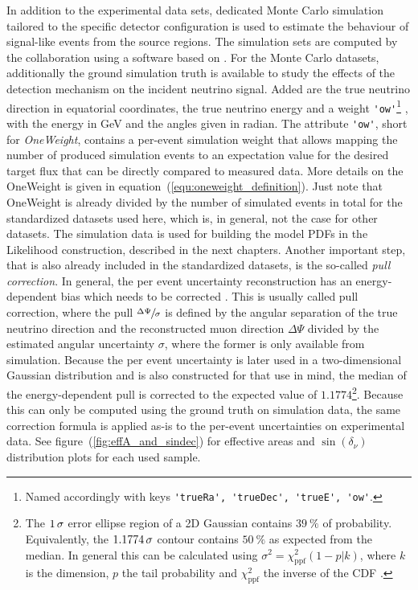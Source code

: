 In addition to the experimental data sets, dedicated Monte Carlo simulation tailored to the specific detector configuration is used to estimate the behaviour of signal-like events from the source regions.
The simulation sets are computed by the collaboration using a software based on \cite{Gazizov:2004va}.
For the Monte Carlo datasets, additionally the ground simulation truth is available to study the effects of the detection mechanism on the incident neutrino signal.
Added are the true neutrino direction in equatorial coordinates, the true neutrino energy and a weight \lstinline!'ow'!\footnote{Named accordingly with keys \lstinline!'trueRa', 'trueDec', 'trueE', 'ow'!.} , with the energy in GeV and the angles given in radian.
The attribute \lstinline!'ow'!, short for \emph{OneWeight}, contains a per-event simulation weight that allows mapping the number of produced simulation events to an expectation value for the desired target flux that can be directly compared to measured data.
More details on the OneWeight is given in equation~(\ref{equ:oneweight_definition}).
Just note that OneWeight is already divided by the number of simulated events in total for the standardized datasets used here, which is, in general, not the case for other datasets.
The simulation data is used for building the model PDFs in the Likelihood construction, described in the next chapters.
Another important step, that is also already included in the standardized datasets, is the so-called \emph{pull correction}.
In general, the per event uncertainty reconstruction has an energy-dependent bias which needs to be corrected \cite{Neunhoffer:2004ha}.
This is usually called pull correction, where the pull $\sfrac{\Delta\Psi}{\sigma}$ is defined by the angular separation of the true neutrino direction and the reconstructed muon direction $\Delta\Psi$ divided by the estimated angular uncertainty $\sigma$, where the former is only available from simulation.
Because the per event uncertainty is later used in a two-dimensional Gaussian distribution and is also constructed for that use in mind, the median of the energy-dependent pull is corrected to the expected value of $\num{1.1774}$\footnote{The $\num{1}\,\sigma$ error ellipse region of a 2D Gaussian contains $\SI{39}{\percent}$ of probability. Equivalently, the $\num{1.1774}\,\sigma$ contour contains $\SI{50}{\percent}$ as expected from the median. In general this can be calculated using $\sigma^2 = \chi^2_\text{ppf}(1-p|k)$, where $k$ is the dimension, $p$ the tail probability and $\chi^2_\text{ppf}$ the inverse of the CDF \cite{Siotani:1963Gaus}.}.
Because this can only be computed using the ground truth on simulation data, the same correction formula is applied as-is to the per-event uncertainties on experimental data.
See figure~(\ref{fig:effA_and_sindec}) for effective areas and $\sin(\delta_\nu)$ distribution plots for each used sample.


